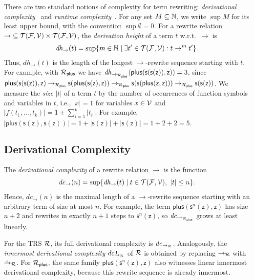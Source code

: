 There are two standard notions of complexity for term rewriting: \emph{derivational complexity}~\cite{hofbauer1989TerminationProofsLength} and \emph{runtime complexity}~\cite{hirokawa2008AutomatedComplexityAnalysis}.
For any set $M \subseteq \mathbb{N}$, we write $\sup M$ for its least upper bound, with the convention $\sup \emptyset = 0$.
For a rewrite relation ${\to} \subseteq \mathcal{T}(\mathcal{F},\mathcal{V}) \times \mathcal{T}(\mathcal{F},\mathcal{V})$, 
the \emph{derivation height} of a term $t$ w.r.t.\ $\to$ is
\[
  \mathit{dh}_{\to}(t) = \sup\{ m \in \mathbb{N} \mid \exists t' \in \mathcal{T}(\mathcal{F},\mathcal{V}) : t \to^{m} t' \}.
\]
Thus, $\mathit{dh}_{\to}(t)$ is the length of the longest $\to$-rewrite sequence starting with $t$.
For example, with $\mathcal{R}_{\mathsf{plus}}$ we have
$\mathit{dh}_{\to_{\mathcal{R}_{\mathsf{plus}}}}(\mathsf{plus}(\mathsf{s}(\mathsf{s}(\mathsf{z})),\mathsf{z})) = 3$,
since
$\mathsf{plus}(\mathsf{s}(\mathsf{s}(\mathsf{z})),\mathsf{z}) 
\to_{\mathcal{R}_{\mathsf{plus}}} \mathsf{s}(\mathsf{plus}(\mathsf{s}(\mathsf{z}),\mathsf{z})) 
\to_{\mathcal{R}_{\mathsf{plus}}} \mathsf{s}(\mathsf{s}(\mathsf{plus}(\mathsf{z},\mathsf{z}))) 
\to_{\mathcal{R}_{\mathsf{plus}}} \mathsf{s}(\mathsf{s}(\mathsf{z}))$.
We measure the \emph{size} $|t|$ of a term $t$ 
by the number of occurrences of function symbols and variables in $t$,
i.e., $|x| = 1$ for variables $x \in \mathcal{V}$ and $|f(t_1,\ldots,t_k)| = 1 + \sum_{i=1}^{k} |t_i|$.
For example, $|\mathsf{plus}(\mathsf{s}(\mathsf{z}),\mathsf{s}(\mathsf{z}))| 
= 1 + |\mathsf{s}(\mathsf{z})| + |\mathsf{s}(\mathsf{z})| = 1 + 2 + 2 = 5$.

\subsection{Derivational Complexity}

The \emph{derivational complexity} of a rewrite relation $\to$ is the function
\[
  \mathit{dc}_{\to}(n) = \sup\{ \mathit{dh}_{\to}(t) \mid t \in \mathcal{T}(\mathcal{F},\mathcal{V}),\ |t| \leq n \}.
\]
Hence, $\mathit{dc}_{\to}(n)$ is the maximal length of a $\to$-rewrite sequence 
starting with an arbitrary term of size at most $n$.
For example, the term $\mathsf{plus}(\mathsf{s}^n(\mathsf{z}),\mathsf{z})$ has size $n+2$ 
and rewrites in exactly $n+1$ steps to $\mathsf{s}^n(\mathsf{z})$, 
so $\mathit{dc}_{\to_{\mathcal{R}_{\mathsf{plus}}}}$ grows at least linearly.

For the TRS $\mathcal{R}$, its full derivational complexity is $\mathit{dc}_{\to_{\mathcal{R}}}$.
Analogously, the \emph{innermost derivational complexity} $\mathit{dc}_{\ito_\Rules}$ of $\mathcal{R}$ is obtained 
by replacing $\to_{\mathcal{R}}$ with $\ito_\Rules$.
For $\mathcal{R}_{\mathsf{plus}}$, the same family $\mathsf{plus}(\mathsf{s}^n(\mathsf{z}),\mathsf{z})$ 
also witnesses linear innermost derivational complexity, because this rewrite sequence is already innermost.

